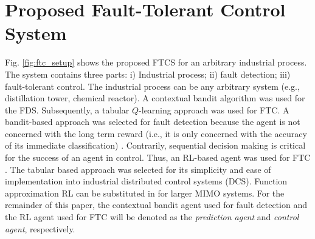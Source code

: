 \section{Proposed Fault-Tolerant Control System}

Fig. \ref{fig:ftc_setup} shows the proposed FTCS for an arbitrary industrial process. The system contains three parts: i) Industrial process; ii) fault detection; iii) fault-tolerant control. The industrial process can be any arbitrary system (e.g., distillation tower, chemical reactor). A contextual bandit algorithm was used for the FDS. Subsequently, a tabular $Q$-learning approach was used for FTC. A bandit-based approach was selected for fault detection because the agent is not concerned with the long term reward (i.e., it is only concerned with the accuracy of its immediate classification) \cite{sutton}.  Contrarily, sequential decision making is critical for the success of an agent in control.  Thus, an RL-based agent was used for FTC \cite{bandits_ref9}. The tabular based approach was selected for its simplicity and ease of implementation into industrial distributed control systems (DCS). Function approximation RL can be substituted in for larger MIMO systems. For the remainder of this paper, the contextual bandit agent used for fault detection and the RL agent used for FTC will be denoted as the \textit{prediction agent} and \textit{control agent}, respectively.

